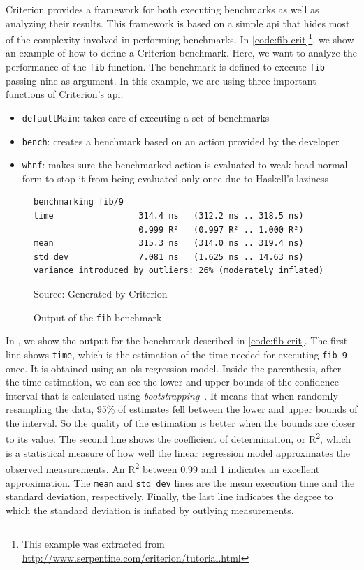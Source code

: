 Criterion provides a framework for both executing benchmarks as well as analyzing their results. This framework is based on a simple \ac{api} that hides most of the complexity involved in performing benchmarks. In \autoref{code:fib-crit}\footnote{This example was extracted from \url{http://www.serpentine.com/criterion/tutorial.html}}, we show an example of how to define a Criterion benchmark. Here, we want to analyze the performance of the \texttt{fib} function. The benchmark is defined to execute \texttt{fib} passing nine as argument. In this example, we are using three important functions of Criterion's \ac{api}:
\begin{itemize}
  \item \texttt{defaultMain}: takes care of executing a set of benchmarks
  \item \texttt{bench}: creates a benchmark based on an action provided by the developer
  \item \texttt{whnf}: makes sure the benchmarked action is evaluated to weak head normal form to stop it from being evaluated only once due to Haskell's laziness
\end{itemize}

\begin{figure}[htp]
  \centering
  \caption{Output of the \texttt{fib} benchmark}
  \begin{verbatim}
benchmarking fib/9
time                 314.4 ns   (312.2 ns .. 318.5 ns)
                     0.999 R²   (0.997 R² .. 1.000 R²)
mean                 315.3 ns   (314.0 ns .. 319.4 ns)
std dev              7.081 ns   (1.625 ns .. 14.63 ns)
variance introduced by outliers: 26% (moderately inflated)
  \end{verbatim}
  \footnotesize{Source: Generated by Criterion}
  \label{fig:fib-output}
\end{figure}

In , we show the output for the benchmark described in \autoref{code:fib-crit}. The first line shows \texttt{time}, which is the estimation of the time needed for executing \texttt{fib 9} once. It is obtained using an \ac{ols} regression model. Inside the parenthesis, after the time estimation, we can see the lower and upper bounds of the confidence interval that is calculated using \emph{bootstrapping}~\cite{davison:1997}. It means that when randomly resampling the data, 95\% of estimates fell between the lower and upper bounds of the interval. So the quality of the estimation is better when the bounds are closer to its value. The second line shows the coefficient of determination, or R\textsuperscript{2}, which is a statistical measure of how well the linear regression model approximates the observed measurements. An R\textsuperscript{2} between 0.99 and 1 indicates an excellent approximation. The \texttt{mean} and \texttt{std dev} lines are the mean execution time and the standard deviation, respectively. Finally, the last line indicates the degree to which the standard deviation is inflated by outlying measurements.

